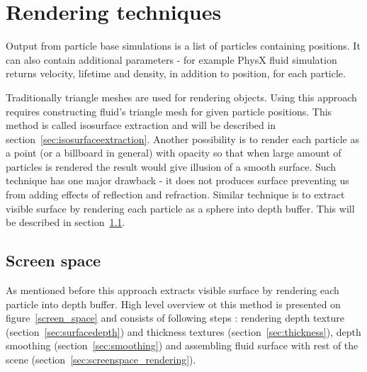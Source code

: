 
\chapter{Rendering techniques} %

\graphicspath{{techniques/figures/}}


Output from particle base simulations is a list of particles containing positions. It can also contain additional parameters - for example PhysX fluid simulation returns velocity, lifetime and density, in addition to position, for each particle. 

Traditionally triangle meshes are used for rendering objects. Using this approach requires constructing fluid's triangle mesh for given particle positions. This method is called isosurface extraction and will be described in section~\ref{sec:isosurfaceextraction}.
Another possibility is to render each particle as a point (or a billboard in general) with opacity so that when large amount of particles is rendered the result would give illusion of a smooth surface. Such technique has one major drawback - it does not produces surface preventing us from adding effects of reflection and refraction.
Similar technique is to extract visible surface by rendering each particle as a sphere into depth buffer. This will be described in section~\ref{sec:screen_space}.

\section{Screen space} \label{sec:screen_space}
As mentioned before this approach extracts visible surface by rendering each particle into depth buffer. High level overview ot this method is presented on figure~\ref{screen_space} and consists of following steps \cite{laanSainz2009}: rendering depth texture (section~\ref{sec:surfacedepth}) and thickness textures (section~\ref{sec:thickness}), depth smoothing (section~\ref{sec:smoothing}) and assembling fluid surface with rest of the scene (section~\ref{sec:screenspace_rendering}).

